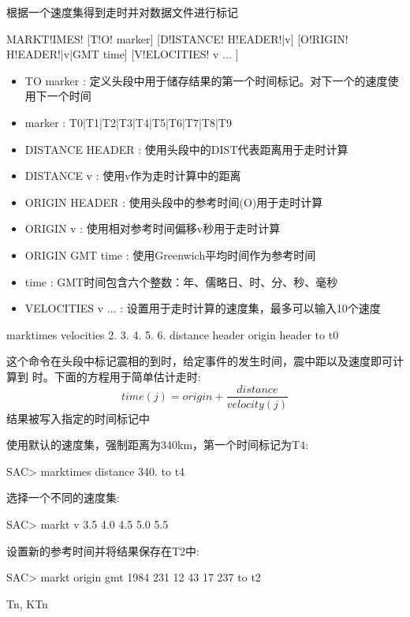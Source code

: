 \label{cmd:marktimes}

根据一个速度集得到走时并对数据文件进行标记

\begin{SACSTX}
MARKT!IMES! [T!O! marker] [D!ISTANCE! H!EADER!|v] [O!RIGIN! H!EADER!|v|GMT time] 
    [V!ELOCITIES! v ... ]
\end{SACSTX}

\begin{itemize}
\item TO marker : 定义头段中用于储存结果的第一个时间标记。对下一个的速度使用下一个时间 
\item marker :  T0|T1|T2|T3|T4|T5|T6|T7|T8|T9 
\item DISTANCE HEADER : 使用头段中的DIST代表距离用于走时计算 
\item DISTANCE v : 使用v作为走时计算中的距离 
\item ORIGIN HEADER : 使用头段中的参考时间(O)用于走时计算 
\item ORIGIN v : 使用相对参考时间偏移v秒用于走时计算 
\item ORIGIN GMT time : 使用Greenwich平均时间作为参考时间 
\item time :  GMT时间包含六个整数：年、儒略日、时、分、秒、毫秒 
\item VELOCITIES v ... : 设置用于走时计算的速度集，最多可以输入10个速度 
\end{itemize}

\begin{SACDFT}
marktimes velocities 2. 3. 4. 5. 6.  distance header origin header to t0
\end{SACDFT}

这个命令在头段中标记震相的到时，给定事件的发生时间，震中距以及速度即可计算到	时。下面的方程用于简单估计走时:
 		\[ time(j) = origin + \frac{distance}{velocity(j)} \]
结果被写入指定的时间标记中

使用默认的速度集，强制距离为340km，第一个时间标记为T4:
\begin{SACCode}
SAC> marktimes distance 340. to t4
\end{SACCode}

选择一个不同的速度集:
\begin{SACCode}
SAC> markt v 3.5 4.0 4.5 5.0 5.5
\end{SACCode}

设置新的参考时间并将结果保存在T2中:
\begin{SACCode}
SAC> markt origin gmt 1984 231 12 43 17 237 to t2
\end{SACCode}

Tn, KTn
